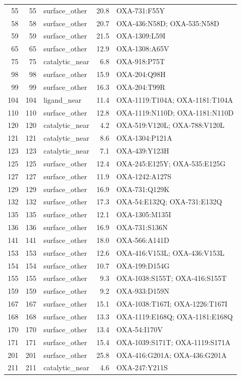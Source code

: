 \begin{longtable}{rrlrl}
55&55&surface\_other&20.8&OXA-731:F55Y\\
58&58&surface\_other&20.7&OXA-436:N58D; OXA-535:N58D\\
59&59&surface\_other&21.5&OXA-1309:L59I\\
65&65&surface\_other&12.9&OXA-1308:A65V\\
75&75&catalytic\_near&6.8&OXA-918:P75T\\
98&98&surface\_other&15.9&OXA-204:Q98H\\
99&99&surface\_other&16.3&OXA-204:T99R\\
104&104&ligand\_near&11.4&OXA-1119:T104A; OXA-1181:T104A\\
110&110&surface\_other&12.8&OXA-1119:N110D; OXA-1181:N110D\\
120&120&catalytic\_near&4.2&OXA-519:V120L; OXA-788:V120L\\
121&121&catalytic\_near&8.6&OXA-1304:P121A\\
123&123&catalytic\_near&7.1&OXA-439:Y123H\\
125&125&surface\_other&12.4&OXA-245:E125Y; OXA-535:E125G\\
127&127&surface\_other&11.9&OXA-1242:A127S\\
129&129&surface\_other&16.9&OXA-731:Q129K\\
132&132&surface\_other&17.3&OXA-54:E132Q; OXA-731:E132Q\\
135&135&surface\_other&12.1&OXA-1305:M135I\\
136&136&surface\_other&16.9&OXA-731:S136N\\
141&141&surface\_other&18.0&OXA-566:A141D\\
153&153&surface\_other&12.6&OXA-416:V153L; OXA-436:V153L\\
154&154&surface\_other&10.7&OXA-199:D154G\\
155&155&surface\_other&9.3&OXA-1038:S155T; OXA-416:S155T\\
159&159&surface\_other&9.2&OXA-933:D159N\\
167&167&surface\_other&15.1&OXA-1038:T167I; OXA-1226:T167I\\
168&168&surface\_other&13.3&OXA-1119:E168Q; OXA-1181:E168Q\\
170&170&surface\_other&13.4&OXA-54:I170V\\
171&171&surface\_other&15.4&OXA-1039:S171T; OXA-1119:S171A\\
201&201&surface\_other&25.8&OXA-416:G201A; OXA-436:G201A\\
211&211&catalytic\_near&4.6&OXA-247:Y211S\\

\end{longtable}

